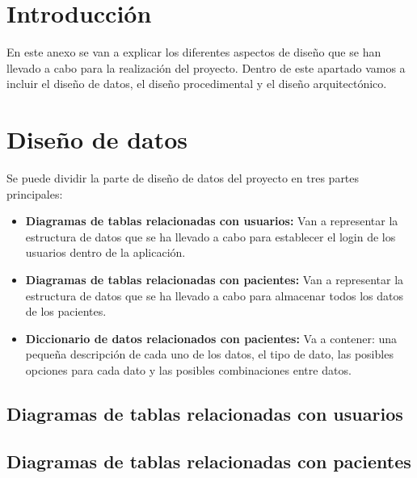 
\section{Introducción}

En este anexo se van a explicar los diferentes aspectos de diseño que se han llevado a cabo para la realización del proyecto. Dentro de este apartado vamos a incluir el diseño de datos, el diseño procedimental y el diseño arquitectónico.

\section{Diseño de datos}

Se puede dividir la parte de diseño de datos del proyecto en tres partes principales:
\begin{itemize}
    \item \textbf{Diagramas de tablas relacionadas con usuarios:} Van a representar la estructura de datos que se ha llevado a cabo para establecer el login de los usuarios dentro de la aplicación.
    \item \textbf{Diagramas de tablas relacionadas con pacientes:} Van a representar la estructura de datos que se ha llevado a cabo para almacenar todos los datos de los pacientes.
    \item \textbf{Diccionario de datos relacionados con pacientes:} Va a contener: una pequeña descripción de cada uno de los datos, el tipo de dato, las posibles opciones para cada dato y las posibles combinaciones entre datos.
\end{itemize}

\newpage

\subsection{Diagramas de tablas relacionadas con usuarios}



\newpage

\subsection{Diagramas de tablas relacionadas con pacientes}

